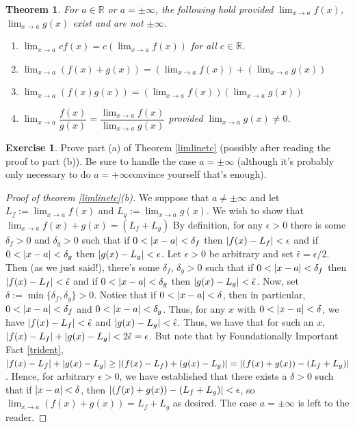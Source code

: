 \documentclass[english]{book}
\DeclarePairedDelimiter\abs{\lvert}{\rvert}%
\newcommand{\RR}{\mathbb{R}}
\newtheorem{theorem}{Theorem}[section]
\theoremstyle{remark}
\theoremstyle{definition}
\newtheorem{excs}{Exercise}[chapter]
\newtheorem*{next week}{Next Week}
\newcommand{\dlim}{\displaystyle\lim}
\begin{document}
\begin{theorem}
	For $a\in \RR$ or $a=\pm \infty$, the following hold provided $\dlim_{x\to a}f(x)$, $\dlim_{x\to a} g(x)$ exist and are not $\pm \infty$. 
	\begin{enumerate}[label=(\alph*)]\label{limlinetc}
\item $\dlim_{x\to a}cf(x)=c\left(\dlim_{x\to a}f(x)\right)$ for all $c\in \RR$. 
\item $\dlim_{x\to a}\left(f(x)+g(x)\right)=\left(\dlim_{x\to a}f(x)\right)+\left(\dlim_{x\to a}g(x)\right)$
\item $\dlim_{x\to a} \left(f(x)g(x)\right)=\left(\dlim_{x\to a}f(x)\right)\left(\dlim_{x\to a}g(x)\right)$
\item $\dlim_{x\to a}\dfrac{f(x)}{g(x)}=\dfrac{\dlim_{x\to a} f(x)}{\dlim_{x\to a}g(x)}$ provided $\dlim_{x\to a}g(x)\neq 0$.
	\end{enumerate}\end{theorem}
\begin{excs}
	Prove part (a) of Theorem \ref{limlinetc} (possibly after reading the proof to part (b)). Be sure to handle the case $a=\pm \infty$ (although it's probably only necessary to do $a=+\infty$\textemdash convince yourself that's enough).
\end{excs}
\begin{proof}[Proof of theorem \ref{limlinetc}(b)]
	We suppose that $a\neq \pm \infty$ and let $L_f:=\dlim_{x\to a} f(x)$ and $L_g:=\dlim_{x\to a} g(x)$. We wish to show that $\lim_{x\to a}f(x)+g(x)=(L_f+L_g)$ By definition, for any $\epsilon>0$ there is some $\delta_f>0$ and $\delta_g>0$ such that if $0<\abs{x-a}<\delta_f$ then $\abs{f(x)-L_f}<\epsilon $ and if $0<\abs{x-a}<\delta_g$ then $\abs{g(x)-L_g}<\epsilon $. Let $\epsilon>0$ be arbitrary and set $\hat{\epsilon}=\epsilon/2$. Then (as we just said!), there's some $\delta_f$, $\delta_g>0$ such that if $0<\abs{x-a}<\delta_f$ then $\abs{f(x)-L_f}<\hat{\epsilon}$ and if $0<\abs{x-a}<\delta_g$ then $\abs{g(x)-L_g}<\hat{\epsilon}$. Now, set $\delta:=\min\{\delta_f,\delta_g\}>0$. Notice that if $0<\abs{x-a}<\delta$, then in particular, $0<\abs{x-a}<\delta_f$ and $0<\abs{x-a}<\delta_g$. Thus, for any $x$ with $0<\abs{x-a}<\delta$, we have $\abs{f(x)-L_f}<\hat{\epsilon}$ and $\abs{g(x)-L_g}<\hat{\epsilon}$. Thus, we have that for such an $x$, $\abs{f(x)-L_f}+\abs{g(x)-L_g}<2\hat\epsilon=\epsilon$. But note that by Foundationally Important Fact \ref{trident}, $\abs{f(x)-L_f}+\abs{g(x)-L_g}\geq \abs{(f(x)-L_f)+(g(x)-L_g)}=\abs{(f(x)+g(x))-(L_f+L_g)}$. Hence, for arbitrary $\epsilon>0$, we have established that there exists a $\delta>0$ such that if $\abs{x-a}<\delta$, then $\abs{(f(x)+g(x))-(L_f+L_g)}<\epsilon$, so $\dlim_{x\to a} (f(x)+g(x))=L_f+L_g$ as desired. The case $a=\pm \infty$ is left to the reader.
\end{proof}
\end{document}
